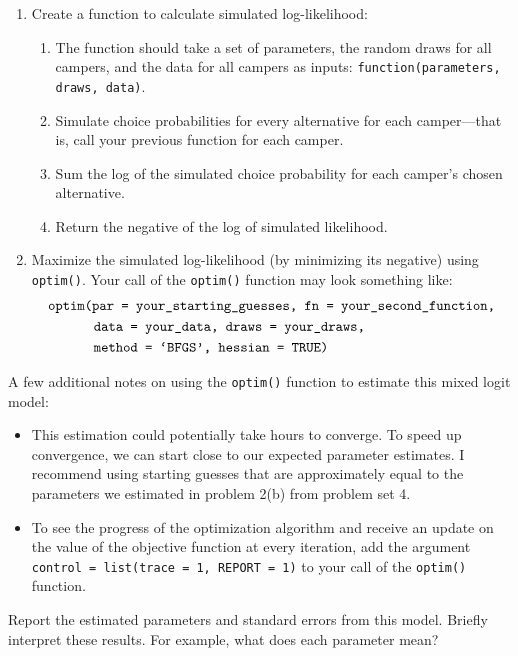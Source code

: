 \documentclass[11pt,letterpaper]{article}
\begin{document}
\begin{enumerate}[label=\alph*., leftmargin=*]
\begin{enumerate}[label=\Roman*.]
\begin{enumerate}[label=\roman*.]
		\end{enumerate}
		\item Create a function to calculate simulated log-likelihood:
		\begin{enumerate}[label=\roman*.]
			\item The function should take a set of parameters, the random draws for all campers, and the data for all campers as inputs: \texttt{function(parameters, draws, data)}.
			\item Simulate choice probabilities for every alternative for each camper---that is, call your previous function for each camper.
			\item Sum the log of the simulated choice probability for each camper's chosen alternative.
			\item Return the negative of the log of simulated likelihood.
		\end{enumerate}
		\item Maximize the simulated log-likelihood (by minimizing its negative) using \texttt{optim()}. Your call of the \texttt{optim()} function may look something like:
		\begin{align*}
			&\text{\texttt{optim(par = your\_starting\_guesses, fn = your\_second\_function,}} \\
			& \qquad \quad \; \text{\texttt{data = your\_data, draws = your\_draws,}} \\
			& \qquad \quad \; \text{\texttt{method = `BFGS', hessian = TRUE)}}
		\end{align*}
	\end{enumerate}
	A few additional notes on using the \texttt{optim()} function to estimate this mixed logit model:
	\begin{itemize}
		\item This estimation could potentially take hours to converge. To speed up convergence, we can start close to our expected parameter estimates. I recommend using starting guesses that are approximately equal to the parameters we estimated in problem 2(b) from problem set 4.
		\item To see the progress of the optimization algorithm and receive an update on the value of the objective function at every iteration, add the argument \texttt{control = list(trace = 1, REPORT = 1)} to your call of the \texttt{optim()} function.
	\end{itemize}
	Report the estimated parameters and standard errors from this model. Briefly interpret these results. For example, what does each parameter mean?


\end{enumerate}
\end{document}
